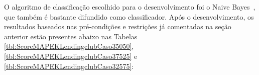 \documentclass[twocolumn]{article}
\begin{document}
O algoritmo de classificação escolhido para o desenvolvimento foi o Naive Bayes~\citep{Naive_Bayes_2004}, que também é bastante difundido como classificador. Após o desenvolvimento, os resultados baseados nas pré-condições e restrições já comentadas na seção anterior estão presentes abaixo nas Tabelas \ref{tbl:ScoreMAPEKLendingclubCaso35050}, \ref{tbl:ScoreMAPEKLendingclubCaso37525} e \ref{tbl:ScoreMAPEKLendingclubCaso32575}:

\begin{table}[H]
\begin{center}
  \caption{Melhores opções escolhidas pelo modelo MAPE-K \\ Todos os métodos - 50\% Performance/50\% Fairness}
\label{tbl:ScoreMAPEKLendingclubCaso35050}
\end{center}
\end{table}
\end{document}
